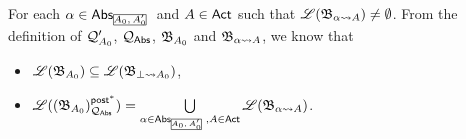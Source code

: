 {%


For each $\alpha\in\abs_{\mhcancel{A_0,A_0'}}$ and $A\in{\sf Act}$ such that ${\mathscr{L} }({\mathfrak{B} }_{\alpha\rightsquigarrow A})\neq \emptyset$.
From the definition of ${\mathcal{Q} }'_{A_0}$, ${\mathcal{Q} }_{{\mathsf{Abs} }}$, ${\mathfrak{B} }_{A_0}$ and ${\mathfrak{B} }_{\alpha\rightsquigarrow A}$, we know that
\begin{itemize}
    \item ${\mathscr{L} }({\mathfrak{B} }_{A_0})\subseteq{\mathscr{L} }({\mathfrak{B} }_{\bot\rightsquigarrow A_0})$,
    \item $\Lang((\AutB_{A_0})^{\post^*}_{\Qq_{\abs}}) = \bigcup\limits_{\alpha\in\abs_{\mhcancel{A_0,A_0'}}, A\in\act}\Lang(\AutB_{\alpha\rightsquigarrow A})$.
\end{itemize}

}
